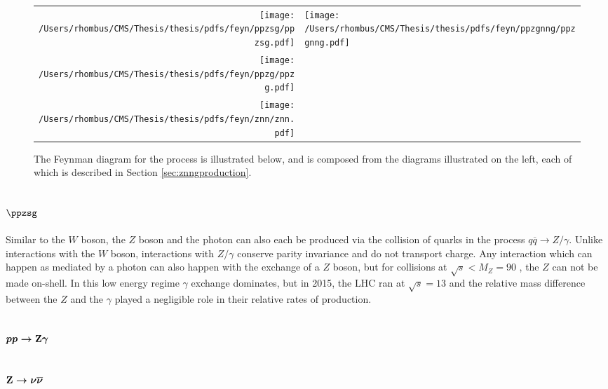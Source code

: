 \begin{figure}[!htb]
 \center
 \caption[Feynman diagrams for \ppzgnng]{
  The Feynman diagram for the process
   \ppzgnng is illustrated below,
   and is composed from the diagrams 
   illustrated on the left, each of which is
   described in Section \ref{sec:znngproduction}.
 } 
\begin{tabular}{rl}
 \texttt{[image: /Users/rhombus/CMS/Thesis/thesis/pdfs/feyn/ppzsg/ppzsg.pdf]} & 
 \multirow{3}{*}{\texttt{[image: /Users/rhombus/CMS/Thesis/thesis/pdfs/feyn/ppzgnng/ppzgnng.pdf]}} \\
 \texttt{[image: /Users/rhombus/CMS/Thesis/thesis/pdfs/feyn/ppzg/ppzg.pdf]} & {} \\
 \texttt{[image: /Users/rhombus/CMS/Thesis/thesis/pdfs/feyn/znn/znn.pdf]} & {}
\end{tabular} 
    \label{fig:ppwbblnbbfeyn}
\end{figure}

 \subsection[\ppzsg]
 {$\boldsymbol{\ppzsg}$}

 Similar to the $W$ boson, the $Z$ boson and the photon can
  also each be produced via the collision of quarks in
  the process $q\overline{q} \rightarrow Z/\gamma$.
 Unlike interactions with the $W$ boson, 
  interactions with $Z/\gamma$ conserve parity invariance
  and do not transport charge.
 Any interaction which can happen as mediated
  by a photon can also happen with the exchange
  of a $Z$ boson, but for collisions at $\sqrt{s}<M_Z = 90$ \GeV,
  the $Z$ can not be made on-shell.
 In this low energy regime $\gamma$ exchange dominates,
  but in 2015, the LHC ran at $\sqrt{s}=13$ \TeV
  and the relative mass difference between the $Z$ and the $\gamma$
  played a negligible role in their relative rates of production. 

 \subsection[\ppzg]
 {$\boldsymbol{pp\rightarrow \mathrm{Z}\gamma}$}
 


 \subsection[\znn]
 {$\boldsymbol{\mathrm{Z}\rightarrow\nu\overline{\nu}}$}





